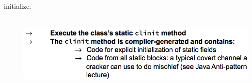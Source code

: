 \documentclass[10pt]{article}
\begin{document}
\begin{description}
	\item[initialize:] \hfill \\ \includegraphics[scale=0.4]{class-loader-initialize.png}
\end{description}



\end{document}
